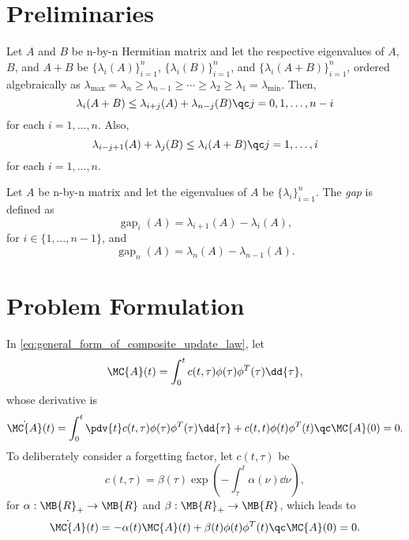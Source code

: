 \documentclass[nobib]{my-handout}
\DeclareMathOperator{\gap}{gap}
\begin{document}
\section{Preliminaries}

\begin{theorem}
	Let $A$ and $B$ be n-by-n Hermitian matrix and let the respective eigenvalues
	of $A$, $B$, and $A+B$ be $\{\lambda_i(A)\}_{i=1}^n$,
	$\{\lambda_i(B)\}_{i=1}^n$, and $\{\lambda_i(A+B)\}_{i=1}^n$, ordered
	algebraically as $\lambda_{\max} = \lambda_n \ge \lambda_{n-1} \ge \cdots \ge
	\lambda_2 \ge \lambda_1 = \lambda_{\min}$. Then,
	\begin{equation*}
		\lambda_i(A+B) \le \lambda_{i+j}(A) + \lambda_{n-j}(B)\qc j=0,1,\dotsc,n-i
	\end{equation*}
	for each $i=1,\dotsc,n$. Also,
	\begin{equation*}
		\lambda_{i-j+1}(A) + \lambda_j(B) \le \lambda_i(A+B)\qc j=1,\dotsc,i
	\end{equation*}
	for each $i=1,\dotsc,n$.
\end{theorem}

\begin{definition}
	Let $A$ be n-by-n matrix and let the eigenvalues of $A$ be
	$\{\lambda_i\}_{i=1}^n$. The \textit{gap} is defined as 
	\begin{equation*}
		\gap_{i}(A) = \lambda_{i+1}(A) - \lambda_i(A),
	\end{equation*}
	for $i \in \{1, \dotsc, n-1\}$, and
	\begin{equation*}
		\gap_n(A) = \lambda_n(A) - \lambda_{n-1}(A).
	\end{equation*}
\end{definition}


\section{Problem Formulation}

In \eqref{eq:general_form_of_composite_update_law}, let
\begin{equation*}
	\MC{A}(t) = \int_0^t c(t, \tau) \phi(\tau) \phi^T(\tau) \dd{\tau},
\end{equation*}
whose derivative is
\begin{equation*}
	\dot{\MC{A}}(t) = \int_0^t \pdv{t} c(t, \tau) \phi(\tau) \phi^T(\tau)
	\dd{\tau} + c(t, t) \phi(t) \phi^T(t) \qc \MC{A}(0) = 0.
\end{equation*}
To deliberately consider a forgetting factor, let $c(t, \tau)$ be
\begin{equation*}
	c(t, \tau) = \beta(\tau) \exp(- \int_\tau^t \alpha(\nu) \dd{\nu}),
\end{equation*}
for $\alpha: \MB{R}_{+} \to \MB{R}$ and $\beta: \MB{R}_{+} \to \MB{R}$,
which leads to 
\begin{equation*}
	\dot{\MC{A}}(t) = - \alpha(t) \MC{A}(t) + \beta(t) \phi(t) \phi^T(t) \qc
	\MC{A}(0) = 0.
\end{equation*}
\end{document}
